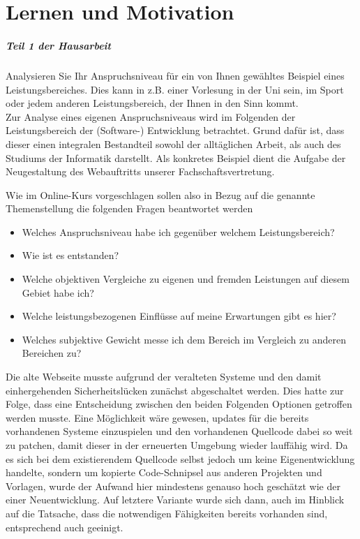 %
\chapter{Lernen und Motivation}
\label{sec:lernen-und-motivation}

\paragraph{Teil 1 der Hausarbeit}
Analysieren Sie Ihr Anspruchsniveau für ein von Ihnen gewähltes Beispiel eines Leistungsbereiches. Dies kann in z.B. einer Vorlesung in der Uni sein, im Sport oder jedem anderen Leistungsbereich, der Ihnen in den Sinn kommt. \\[0.4em]

Zur Analyse eines eigenen Anspruchsniveaus wird im Folgenden der Leistungsbereich der (Software-) Entwicklung betrachtet. Grund dafür ist, dass dieser einen integralen Bestandteil sowohl der alltäglichen Arbeit, als auch des Studiums der Informatik darstellt.
Als konkretes Beispiel dient die Aufgabe der Neugestaltung des Webauftritts unserer Fachschaftsvertretung.

Wie im Online-Kurs vorgeschlagen sollen also in Bezug auf die genannte Themenstellung  die folgenden Fragen beantwortet werden \cite{WEB:VHB:LuSt1:Anspruchsniveau}
\begin{itemize}
    \item Welches Anspruchsniveau habe ich gegenüber welchem Leistungsbereich?
    \item Wie ist es entstanden?
    \item Welche objektiven Vergleiche zu eigenen und fremden Leistungen auf diesem Gebiet habe ich?
    \item Welche leistungsbezogenen Einflüsse auf meine Erwartungen gibt es hier?
    \item Welches subjektive Gewicht messe ich dem Bereich im Vergleich zu anderen Bereichen zu?
\end{itemize}

Die alte Webseite musste aufgrund der veralteten Systeme und den damit einhergehenden Sicherheitslücken zunächst abgeschaltet werden. Dies hatte zur Folge, dass eine Entscheidung zwischen den beiden Folgenden Optionen getroffen werden musste.
Eine Möglichkeit wäre gewesen, updates für die bereits vorhandenen Systeme einzuspielen und den vorhandenen Quellcode dabei so weit zu patchen, damit dieser in der erneuerten Umgebung wieder lauffähig wird. Da es sich bei dem existierendem Quellcode selbst jedoch um keine Eigenentwicklung handelte, sondern um kopierte Code-Schnipsel aus anderen Projekten und Vorlagen, wurde der Aufwand hier mindestens genauso hoch geschätzt wie der einer Neuentwicklung. Auf letztere Variante wurde sich dann, auch im Hinblick auf die Tatsache, dass die notwendigen Fähigkeiten bereits vorhanden sind, entsprechend auch geeinigt.

